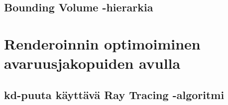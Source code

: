 \documentclass[a4paper,12pt, titlepage]{article}
\theoremstyle{break}
\begin{document}
\subsection{Bounding Volume -hierarkia}

\newpage
\section{Renderoinnin optimoiminen avaruusjakopuiden avulla}
\subsection{kd-puuta käyttävä Ray Tracing -algoritmi}
\cite{havran}

\newpage

\listofalgorithms
\end{document}
